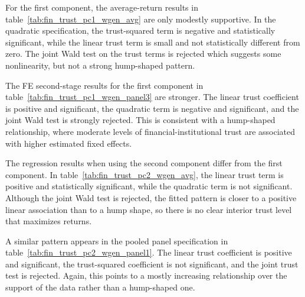 \label{tab:fin_trust_loadings}
\FloatBarrier

\par For the first component, the average-return results in table~\ref{tab:fin_trust_pc1_wgen_avg} are only modestly supportive. In the quadratic specification, the trust-squared term is negative and statistically significant, while the linear trust term is small and not statistically different from zero. The joint Wald test on the trust terms is rejected which suggests some nonlinearity, but not a strong hump-shaped pattern.

\label{tab:fin_trust_pc1_wgen_avg}
\FloatBarrier

\par The FE second-stage results for the first component in table~\ref{tab:fin_trust_pc1_wgen_panel3} are stronger. The linear trust coefficient is positive and significant, the quadratic term is negative and significant, and the joint Wald test is strongly rejected. This is consistent with a hump-shaped relationship, where moderate levels of financial-institutional trust are associated with higher estimated fixed effects.

\label{tab:fin_trust_pc1_wgen_panel3}
\FloatBarrier

\par The regression results when using the second component differ from the first component. In table~\ref{tab:fin_trust_pc2_wgen_avg}, the linear trust term is positive and statistically significant, while the quadratic term is not significant. Although the joint Wald test is rejected, the fitted pattern is closer to a positive linear association than to a hump shape, so there is no clear interior trust level that maximizes returns.

\label{tab:fin_trust_pc2_wgen_avg}
\FloatBarrier

\par A similar pattern appears in the pooled panel specification in table~\ref{tab:fin_trust_pc2_wgen_panel1}. The linear trust coefficient is positive and significant, the trust-squared coefficient is not significant, and the joint trust test is rejected. Again, this points to a mostly increasing relationship over the support of the data rather than a hump-shaped one.

